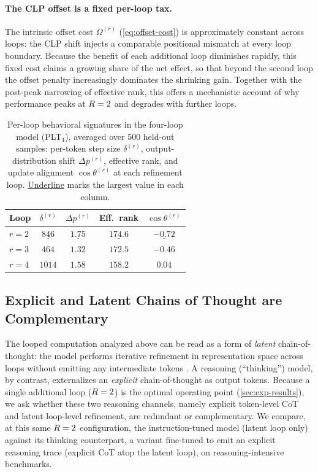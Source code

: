 \paragraph{The CLP offset is a fixed per-loop tax.}
The intrinsic offset cost $\Omega^{(r)}$ (\autoref{eq:offset-cost}) is
approximately constant across loops: the CLP shift injects a comparable
positional mismatch at every loop boundary.
Because the benefit of each additional loop diminishes rapidly, this fixed cost
claims a growing share of the net effect, so that beyond the second loop the
offset penalty increasingly dominates the shrinking gain.
Together with the post-peak narrowing of effective rank, this offers a
mechanistic account of why performance peaks at $R=2$ and degrades
with further loops.

\begin{table}[h]
\centering
\caption{Per-loop behavioral signatures in the four-loop model (PLT$_4$),
averaged over 500 held-out samples: per-token step size $\delta^{(r)}$,
output-distribution shift $\Delta p^{(r)}$, effective rank, and update
alignment $\cos\theta^{(r)}$ at each refinement loop. \underline{Underline}
marks the largest value in each column.}
\label{tab:behavior-summary}
\begin{tabular}{lcccc}
\toprule
\textbf{Loop} & $\delta^{(r)}$ & $\Delta p^{(r)}$ & \textbf{Eff.\ rank} & $\cos\theta^{(r)}$ \\
\midrule
$r=2$ & $\underline{846}$            & $\underline{1.75}$  & $\underline{174.6}$ & $\underline{-0.72}$ \\
$r=3$ & $464$            & $1.32$              & $172.5$             & $-0.46$ \\
$r=4$ & $1014$ & $1.58$            & $158.2$             & $0.04$ \\
\bottomrule
\end{tabular}
\end{table}

\subsection{Explicit and Latent Chains of Thought are Complementary}
\label{sec:analysis-cot}

The looped computation analyzed above can be read as a form of \emph{latent}
chain-of-thought: the model performs iterative refinement in representation
space across loops without emitting any intermediate tokens
\citep{geiping2025scaling,lu2025latent}.
A reasoning (``thinking'') model, by contrast, externalizes an \emph{explicit}
chain-of-thought as output tokens.
Because a single additional loop ($R = 2$) is the optimal operating
point (\autoref{sec:exp-results}), we ask whether these two reasoning
channels, namely explicit token-level CoT and latent loop-level refinement,
are redundant or complementary.
We compare, at this same $R = 2$ configuration, the instruction-tuned
model (latent loop only) against its thinking counterpart, a variant fine-tuned
to emit an explicit reasoning trace (explicit CoT atop the latent loop), on
reasoning-intensive benchmarks.

